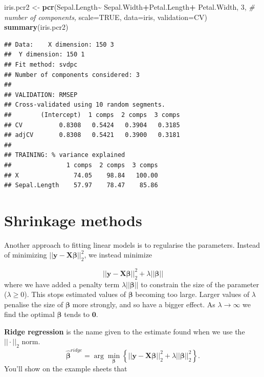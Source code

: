 \documentclass[
]{book}
\newenvironment{Shaded}{\begin{snugshade}}{\end{snugshade}}
\newcommand{\AttributeTok}[1]{\textcolor[rgb]{0.13,0.29,0.53}{#1}}
\newcommand{\CommentTok}[1]{\textcolor[rgb]{0.56,0.35,0.01}{\textit{#1}}}
\newcommand{\ConstantTok}[1]{\textcolor[rgb]{0.56,0.35,0.01}{#1}}
\newcommand{\DecValTok}[1]{\textcolor[rgb]{0.00,0.00,0.81}{#1}}
\newcommand{\FunctionTok}[1]{\textcolor[rgb]{0.13,0.29,0.53}{\textbf{#1}}}
\newcommand{\NormalTok}[1]{#1}
\newcommand{\OtherTok}[1]{\textcolor[rgb]{0.56,0.35,0.01}{#1}}
\newcommand{\SpecialCharTok}[1]{\textcolor[rgb]{0.81,0.36,0.00}{\textbf{#1}}}
\newcommand{\StringTok}[1]{\textcolor[rgb]{0.31,0.60,0.02}{#1}}
\theoremstyle{definition}
\theoremstyle{definition}
\theoremstyle{definition}
\theoremstyle{definition}
\theoremstyle{remark}
\begin{document}
\begin{Shaded}
\begin{Highlighting}[]
\NormalTok{iris.pcr2 }\OtherTok{\textless{}{-}} \FunctionTok{pcr}\NormalTok{(Sepal.Length}\SpecialCharTok{\textasciitilde{}}\NormalTok{ Sepal.Width}\SpecialCharTok{+}\NormalTok{Petal.Length}\SpecialCharTok{+}
\NormalTok{                   Petal.Width, }\DecValTok{3}\NormalTok{, }\CommentTok{\# number of components,}
                \AttributeTok{scale=}\ConstantTok{TRUE}\NormalTok{, }\AttributeTok{data=}\NormalTok{iris, }\AttributeTok{validation=}\StringTok{\textquotesingle{}CV\textquotesingle{}}\NormalTok{)}
\FunctionTok{summary}\NormalTok{(iris.pcr2)}
\end{Highlighting}
\end{Shaded}

\begin{verbatim}
## Data:    X dimension: 150 3 
##  Y dimension: 150 1
## Fit method: svdpc
## Number of components considered: 3
## 
## VALIDATION: RMSEP
## Cross-validated using 10 random segments.
##        (Intercept)  1 comps  2 comps  3 comps
## CV          0.8308   0.5424   0.3904   0.3185
## adjCV       0.8308   0.5421   0.3900   0.3181
## 
## TRAINING: % variance explained
##               1 comps  2 comps  3 comps
## X               74.05    98.84   100.00
## Sepal.Length    57.97    78.47    85.86
\end{verbatim}

\hypertarget{shrinkage-methods}{%
\section{Shrinkage methods}\label{shrinkage-methods}}

Another approach to fitting linear models is to regularise the parameters. Instead of minimizing \(||\mathbf y- \mathbf X\boldsymbol \beta||^2_2\), we instead minimize

\[||\mathbf y- \mathbf X\boldsymbol \beta||^2_2+\lambda||\boldsymbol \beta||\]
where we have added a penalty term \(\lambda||\boldsymbol \beta||\) to constrain the size of the parameter (\(\lambda\geq 0\)). This stops estimated values of \(\boldsymbol \beta\) becoming too large.
Larger values of \(\lambda\) penalise the size of \(\boldsymbol \beta\) more strongly, and so have a bigger effect. As \(\lambda \rightarrow \infty\) we find the optimal \(\boldsymbol \beta\) tends to \({\boldsymbol 0}\).

\textbf{Ridge regression} is the name given to the estimate found when we use the \(||\cdot||_2\) norm.
\[\hat{\boldsymbol \beta}^{ridge} = \arg \min_{\boldsymbol \beta} \left\{||\mathbf y- \mathbf X\boldsymbol \beta||^2_2+\lambda||\boldsymbol \beta||_2^2 \right\}.\]
You'll show on the example sheets that
\end{document}
